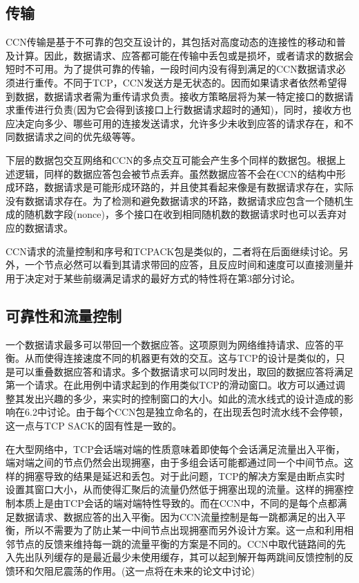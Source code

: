 \subsection*{传输}
\par
CCN传输是基于不可靠的包交互设计的，其包括对高度动态的连接性的移动和普及计算。因此，数据请求、应答都可能在传输中丢包或是损坏，或者请求的数据会短时不可用。为了提供可靠的传输，一段时间内没有得到满足的CCN数据请求必须进行重传。不同于TCP，CCN发送方是无状态的。因而如果请求者依然希望得到数据，数据请求者需为重传请求负责。接收方策略层将为某一特定接口的数据请求重传进行负责(因为它会得到该接口上行数据请求超时的通知)，同时，接收方也应决定向多少、哪些可用的连接发送请求，允许多少未收到应答的请求存在，和不同数据请求之间的优先级等等。
\par
下层的数据包交互网络和CCN的多点交互可能会产生多个同样的数据包。根据上述逻辑，同样的数据应答包会被节点丢弃。虽然数据应答不会在CCN的结构中形成环路，数据请求是可能形成环路的，并且使其看起来像是有数据请求存在，实际没有数据请求存在。为了检测和避免数据请求的环路，数据请求应包含一个随机生成的随机数字段(nonce)，多个接口在收到相同随机数的数据请求时也可以丢弃对应的数据请求。
\par
CCN请求的流量控制和序号和TCPACK包是类似的，二者将在后面继续讨论。另外，一个节点必然可以看到其请求带回的应答，且反应时间和速度可以直接测量并用于决定对于某些前缀满足请求的最好方式的特性将在第3部分讨论。

\subsection*{可靠性和流量控制}
\par
一个数据请求最多可以带回一个数据应答。这项原则为网络维持请求、应答的平衡。从而使得连接速度不同的机器更有效的交互。这与TCP的设计是类似的，只是可以重叠数据应答和请求。多个数据请求可以同时发出，取回的数据应答将满足第一个请求。在此用例中请求起到的作用类似TCP的滑动窗口。收方可以通过调整其发出兴趣的多少，来实时的控制窗口的大小。如此的流水线式的设计造成的影响在6.2中讨论。由于每个CCN包是独立命名的，在出现丢包时流水线不会停顿，这一点与TCP SACK的固有性是一致的。
\par
在大型网络中，TCP会话端对端的性质意味着即使每个会话满足流量出入平衡，端对端之间的节点仍然会出现拥塞，由于多组会话可能都通过同一个中间节点。这样的拥塞导致的结果是延迟和丢包。对于此问题，TCP的解决方案是由断点实时设置其窗口大小，从而使得汇聚后的流量仍然低于拥塞出现的流量。这样的拥塞控制本质上是由TCP会话的端对端特性导致的。而在CCN中，不同的是每个点都满足数据请求、数据应答的出入平衡。因为CCN流量控制是每一跳都满足的出入平衡，所以不需要为了防止某一中间节点出现拥塞而另外设计方案。这一点和利用相邻节点的反馈来维持每一跳的流量平衡的方案是不同的。CCN中取代链路间的先入先出队列缓存的是最近最少未使用缓存，其可以起到解开每两跳间反馈控制的反馈环和欠阻尼震荡的作用。(这一点将在未来的论文中讨论)

